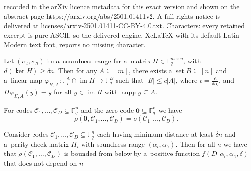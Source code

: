 \documentclass[10pt,a4paper]{amsart}
\DeclareMathOperator{\im}{im}
\DeclareMathOperator{\supp}{supp}
\let\phi\varphi
\let\phi\varphi
\newcommand{\F}{\mathbb{F}}
\newcommand{\cC}{\mathcal{C}}
\begin{document}
recorded in the arXiv licence metadata for this exact version and shown on the abstract page https://arxiv.org/abs/2501.01411v2. A full rights notice is delivered at licenses/arxiv-2501.01411-CC-BY-4.0.txt. Characters: every retained excerpt is pure ASCII, so the delivered engine, XeLaTeX with its default Latin Modern text font, reports no missing character.
\begin{lemma}\label{lemma:inv-supp}
Let $(\alpha_l, \alpha_h)$ be a~soundness range for a~matrix $H \in \F_q^{m \times n}$, with $d(\ker H) \geq \delta n$. Then for any $A \subseteq [m]$, there exists a~set $B \subseteq [n]$ and a~linear map $\phi_{H,A}:\F_q^A\cap \im H\to \F_q^B$ such that $|B| \leq c|A|$, where $c = \frac{6}{\delta \alpha_l}$, and $H \phi_{H,A}(y)=y$ for all $y \in \im H$ with $\supp y \subseteq A$.
\end{lemma}

\begin{lemma}\label{lemma:add-zero-code}
    For codes $\cC_1,...,\cC_D\subseteq \F_q^n$ and the zero code $\mathbf{0}\subseteq \F_q^n$ we have \[
    \rho(\mathbf{0},\cC_1,...,\cC_D)= \rho(\cC_1,...,\cC_D).
    \]
\end{lemma}

\begin{lemma}\label{lemma:prod-ltc}
Consider codes $\cC_1,\dots,\cC_D\subseteq \F_q^n$ each having minimum distance at least $\delta n$ and a~parity-check matrix $H_i$ with soundness range $(\alpha_l,\alpha_h)$. Then for all $n$ we have that $\rho(\cC_1,\dots,\cC_D)$ is bounded from below by a~positive function $f(D, \alpha_l, \alpha_h, \delta)$ that does not depend on $n$.
\end{lemma}
\end{document}
